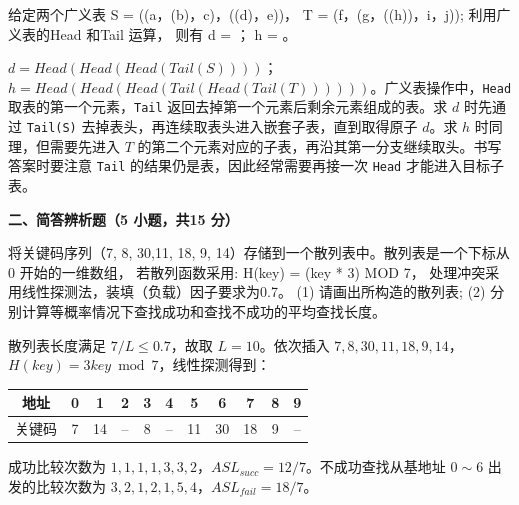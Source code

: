 \begin{question}
给定两个广义表 S = ((a，(b)，c)，((d)，e))， T = (f，(g，((h))，i，j)); 利用广义表的Head 和Tail 运算， 则有
d = \blank；
h = \blank。

\begin{solution}
$d=Head(Head(Head(Tail(S))))$；$h=Head(Head(Head(Tail(Head(Tail(T))))))$。广义表操作中，\texttt{Head} 取表的第一个元素，\texttt{Tail} 返回去掉第一个元素后剩余元素组成的表。求 $d$ 时先通过 \texttt{Tail(S)} 去掉表头，再连续取表头进入嵌套子表，直到取得原子 $d$。求 $h$ 时同理，但需要先进入 $T$ 的第二个元素对应的子表，再沿其第一分支继续取头。书写答案时要注意 \texttt{Tail} 的结果仍是表，因此经常需要再接一次 \texttt{Head} 才能进入目标子表。
\end{solution}
\end{question}

\textbf{二、简答辨析题（5 小题，共15 分）}
\begin{question}[2 分]
将关键码序列（7, 8, 30,11, 18, 9, 14）存储到一个散列表中。散列表是一个下标从0 开始的一维数组， 若散列函数采用: H(key) = (key * 3) MOD 7， 处理冲突采用线性探测法，装填（负载）因子要求为0.7。
(1) 请画出所构造的散列表;
(2) 分别计算等概率情况下查找成功和查找不成功的平均查找长度。

\begin{solution}
散列表长度满足 $7/L\le0.7$，故取 $L=10$。依次插入 $7,8,30,11,18,9,14$，$H(key)=3key\bmod7$，线性探测得到：
  \begin{center}
  \begin{tabular}{c|cccccccccc}
  地址&0&1&2&3&4&5&6&7&8&9\\ \hline
  关键码&7&14&--&8&--&11&30&18&9&--
  \end{tabular}
  \end{center}
  成功比较次数为 $1,1,1,1,3,3,2$，$ASL_{succ}=12/7$。不成功查找从基地址 $0\sim6$ 出发的比较次数为 $3,2,1,2,1,5,4$，$ASL_{fail}=18/7$。
\end{solution}
\end{question}

